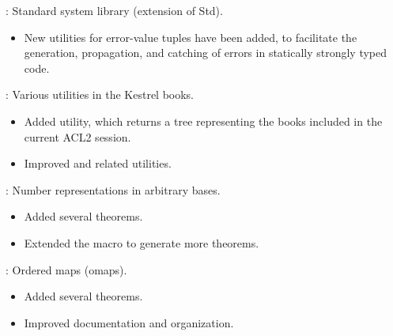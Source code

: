 
\begin{frame}

\implibtitle

:
Standard system library (extension of Std).
\begin{itemize}
\item New utilities for error-value tuples have been added,
      to facilitate the generation, propagation, and catching of errors
      in statically strongly typed code.
\end{itemize}

\end{frame}


\begin{frame}

\implibtitle

:
Various utilities in the Kestrel books.
\begin{itemize}
\item Added  utility,
      which returns a tree representing
      the books included in the current ACL2 session.
\item Improved  and related utilities.
\end{itemize}

\end{frame}


\begin{frame}

\implibtitle

:
Number representations in arbitrary bases.
\begin{itemize}
\item Added several theorems.
\item Extended the  macro to generate more theorems.
\end{itemize}

\end{frame}


\begin{frame}

\implibtitle

:
Ordered maps (omaps).
\begin{itemize}
\item Added several theorems.
\item Improved documentation and organization.
\end{itemize}

\end{frame}


